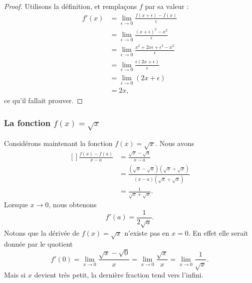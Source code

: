 \begin{proof}
    Utilisons la définition, et remplaçons $f$ par sa valeur :
    \begin{subequations}
        \begin{align}
            f'(x)   &=\lim_{\epsilon\to 0}\frac{ f(x+\epsilon)-f(x) }{ \epsilon }\\
                &=\lim_{\epsilon\to 0}\frac{ (x+\epsilon)^2-x^2 }{ \epsilon }\\
                &=\lim_{\epsilon\to 0}\frac{ x^2+2x\epsilon+\epsilon^2-x^2 }{ \epsilon }\\
                &=\lim_{\epsilon\to 0}\frac{\epsilon(2x+\epsilon)}{ \epsilon }\\
                &=\lim_{\epsilon\to 0}(2x+\epsilon)\\
                &=2x,
        \end{align}
    \end{subequations}
    ce qu'il fallait prouver.
\end{proof}


\subsubsection{La fonction $f(x)=\sqrt{x}$}

Considérons maintenant la fonction $f(x)=\sqrt{x}$. Nous avons
\begin{equation}
	\begin{aligned}[]
		\frac{ f(x)-f(a) }{ x-a }&=\frac{ \sqrt{x}-\sqrt{a} }{ x-a }\\
		&=\frac{ (\sqrt{x}-\sqrt{a})(\sqrt{x}+\sqrt{x}) }{ (x-a)(\sqrt{x}+\sqrt{x}) }\\
		&=\frac{1}{ \sqrt{x}+\sqrt{x} }.
	\end{aligned}
\end{equation}
Lorsque $x\to 0$, nous obtenons
\begin{equation}
	f'(a)=\frac{1}{ 2\sqrt{a} }.
\end{equation}
Notons que la dérivée de $f(x)=\sqrt{x}$ n'existe pas en $x=0$. En effet elle serait donnée par le quotient
\begin{equation}
	f'(0)=\lim_{x\to 0} \frac{ \sqrt{x}-\sqrt{0} }{ x }=\lim_{x\to 0} \frac{ \sqrt{x} }{ x }=\lim_{x\to 0} \frac{1}{ \sqrt{x} }.
\end{equation}
Mais si $x$ devient très petit, la dernière fraction tend vers l'infini.

